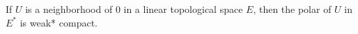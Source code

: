 If $U$ is a neighborhood of $0$ in a linear topological space $E$, then the polar of $U$ in $E^*$ is weak* compact.
